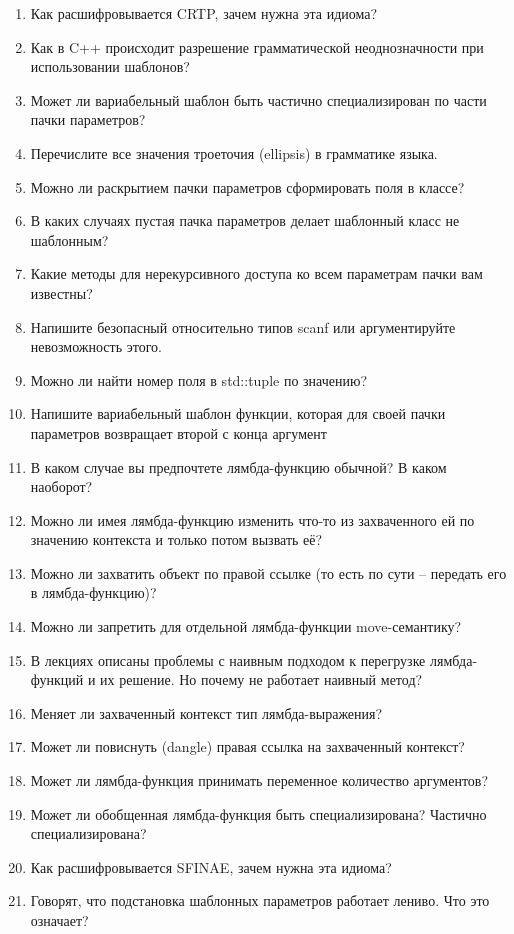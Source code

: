 \documentclass[a4paper,12pt,oneside]{article}
\begin{document}
\begin{enumerate}
\item Как расшифровывается CRTP, зачем нужна эта идиома?
\item Как в C++ происходит разрешение грамматической неоднозначности при использовании шаблонов?
\item Может ли вариабельный шаблон быть частично специализирован по части пачки параметров?
\item Перечислите все значения троеточия (ellipsis) в грамматике языка.
\item Можно ли раскрытием пачки параметров сформировать поля в классе?
\item В каких случаях пустая пачка параметров делает шаблонный класс не шаблонным?
\item Какие методы для нерекурсивного доступа ко всем параметрам пачки вам известны?
\item Напишите безопасный относительно типов scanf или аргументируйте невозможность этого.
\item Можно ли найти номер поля в std::tuple по значению?
\item Напишите вариабельный шаблон функции, которая для своей пачки параметров возвращает второй с конца аргумент
\item В каком случае вы предпочтете лямбда-функцию обычной? В каком наоборот?
\item Можно ли имея лямбда-функцию изменить что-то из захваченного ей по значению контекста и только потом вызвать её?
\item Можно ли захватить объект по правой ссылке (то есть по сути -- передать его в лямбда-функцию)?
\item Можно ли запретить для отдельной лямбда-функции move-семантику?
\item В лекциях описаны проблемы с наивным подходом к перегрузке лямбда-функций и их решение. Но почему не работает наивный метод?
\item Меняет ли захваченный контекст тип лямбда-выражения?
\item Может ли повиснуть (dangle) правая ссылка на захваченный контекст?
\item Может ли лямбда-функция принимать переменное количество аргументов?
\item Может ли обобщенная лямбда-функция быть специализирована? Частично специализирована?
\item Как расшифровывается SFINAE, зачем нужна эта идиома?
\item Говорят, что подстановка шаблонных параметров работает лениво. Что это означает?

\end{enumerate}
\end{document}
